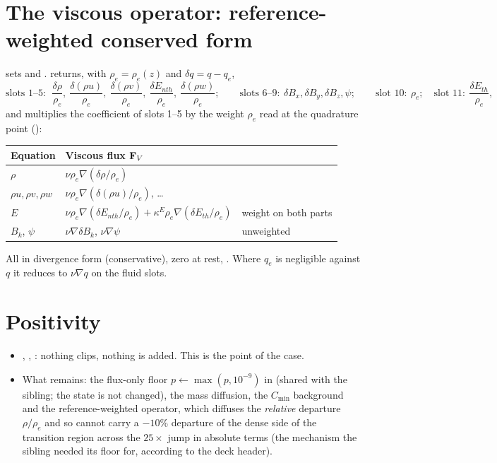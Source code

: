 \documentclass[10pt]{article}
\begin{document}
\section{The viscous operator: reference-weighted conserved form}
 sets  and  .
 returns, with $\rho_e=\rho_e(z)$ and $\delta q=q-q_e$,
\[
\text{slots }1\text{--}5:\ \ \frac{\delta\rho}{\rho_e},\ \frac{\delta(\rho u)}{\rho_e},\ \frac{\delta(\rho v)}{\rho_e},\
\frac{\delta E_{nth}}{\rho_e},\ \frac{\delta(\rho w)}{\rho_e};\qquad
\text{slots }6\text{--}9:\ \delta B_x,\delta B_y,\delta B_z,\psi;\qquad
\text{slot }10:\ \rho_e;\quad \text{slot }11:\ \frac{\delta E_{th}}{\rho_e},
\]
and  multiplies the coefficient of slots 1--5 by the weight $\rho_e$ read at the
quadrature point (\code{rhs.jl:2978}):
\begin{center}\small
\begin{tabular}{@{}lll@{}}
\toprule
Equation & Viscous flux $\mathbf{F}_V$ & \\
\midrule
$\rho$ & $\nu\rho_e\nabla(\delta\rho/\rho_e)$ & \cm{mass diffusion on}\\
$\rho u,\rho v,\rho w$ & $\nu\rho_e\nabla(\delta(\rho u)/\rho_e)$, \dots & \\
$E$ & $\nu\rho_e\nabla(\delta E_{nth}/\rho_e)+\kappa^E\rho_e\nabla(\delta E_{th}/\rho_e)$ & weight on both parts\\
$B_k$, $\psi$ & $\nu\nabla\delta B_k$, $\nu\nabla\psi$ & unweighted\\
\bottomrule
\end{tabular}
\end{center}
All in divergence form (conservative), zero at rest, .
Where $q_e$ is negligible against $q$ it reduces to $\nu\nabla q$ on the fluid slots.

\section{Positivity}
\begin{itemize}[leftmargin=*]
\item {}, , : nothing clips,
nothing is added. This is the point of the case.
\item What remains: the flux-only floor $p\leftarrow\max(p,10^{-9})$ in  (shared with the
sibling; the state is not changed), the mass diffusion, the $C_{\min}$ background and the
reference-weighted operator, which diffuses the \emph{relative} departure $\rho/\rho_e$ and so cannot carry a
$-10\%$ departure of the dense side of the transition region across the $25\times$ jump in absolute terms
(the mechanism the sibling needed its floor for, according to the deck header).
\end{itemize}
\end{document}
